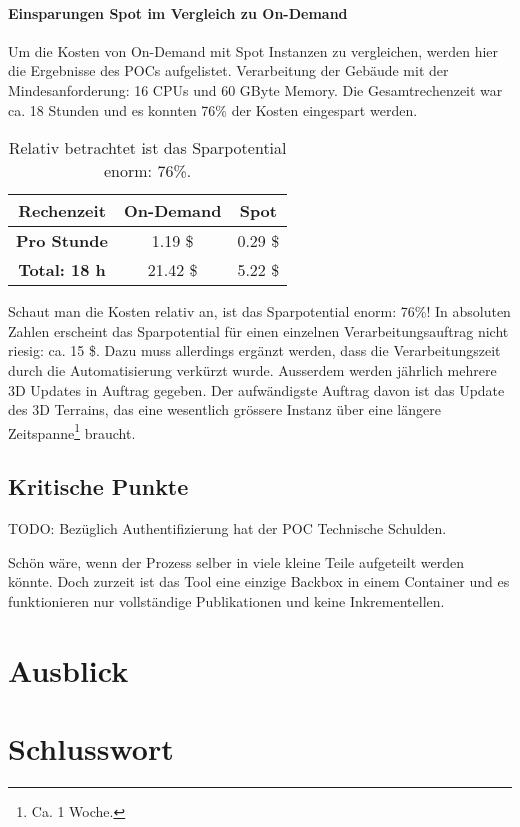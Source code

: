 \paragraph{Einsparungen Spot im Vergleich zu On-Demand}
Um die Kosten von On-Demand mit Spot Instanzen zu vergleichen, werden hier die Ergebnisse des POCs aufgelistet. Verarbeitung der Gebäude mit der Mindesanforderung: 16 CPUs und 60 GByte Memory. Die Gesamtrechenzeit war ca. 18 Stunden und es konnten 76\% der Kosten eingespart werden.

\begin{table}[!htbp]
\begin{center}
\begin{tabular}{| c | c | c |}
    \hline
	\textbf{Rechenzeit} & \textbf{On-Demand} & \textbf{Spot}\\
	\hline
	 \textbf{Pro Stunde} & 1.19 \$ & 0.29 \$\\
	\hline
	 \textbf{Total: 18 h} & 21.42 \$ & 5.22 \$\\
	\hline
\end{tabular}
\caption{\label{tab:price_difference}Relativ betrachtet ist das Sparpotential enorm: 76\%.}
\end{center}
\end{table}

Schaut man die Kosten relativ an, ist das Sparpotential enorm: 76\%! In absoluten Zahlen erscheint das Sparpotential für einen einzelnen Verarbeitungsauftrag nicht riesig: ca. 15 \$. Dazu muss allerdings ergänzt werden, dass die Verarbeitungszeit durch die Automatisierung verkürzt wurde. Ausserdem werden jährlich mehrere 3D Updates in Auftrag gegeben. Der aufwändigste Auftrag davon ist das Update des 3D Terrains, das eine wesentlich grössere Instanz über eine längere Zeitspanne\footnote{Ca. 1 Woche.} braucht. 

\subsection{Kritische Punkte}
TODO: 
Bezüglich Authentifizierung hat der POC Technische Schulden.

Schön wäre, wenn der Prozess selber in viele kleine Teile aufgeteilt werden könnte. Doch zurzeit ist das Tool eine einzige Backbox in einem Container und es funktionieren nur vollständige Publikationen und keine Inkrementellen. 


\section{Ausblick}

\section{Schlusswort}
